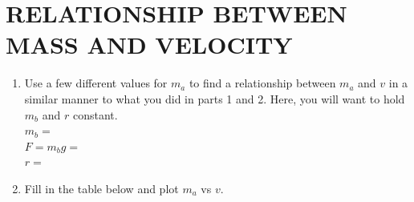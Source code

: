 \documentclass[11pt,letterpaper]{article}
\begin{document}
\section{RELATIONSHIP BETWEEN MASS AND VELOCITY}
\begin{enumerate}
\item Use a few different values for $m_a$ to find a relationship between
$m_a$ and $v$ in a similar manner to what you did in parts 1 and 2. Here, you will want to hold $m_b$ and $r$ constant.\\
$m_b=$\\

$F=m_bg=$\\

$r=$

\item Fill in the table below and plot $m_a$ vs $v$.
\end{enumerate}

\vspace{.5cm}
\end{document}
